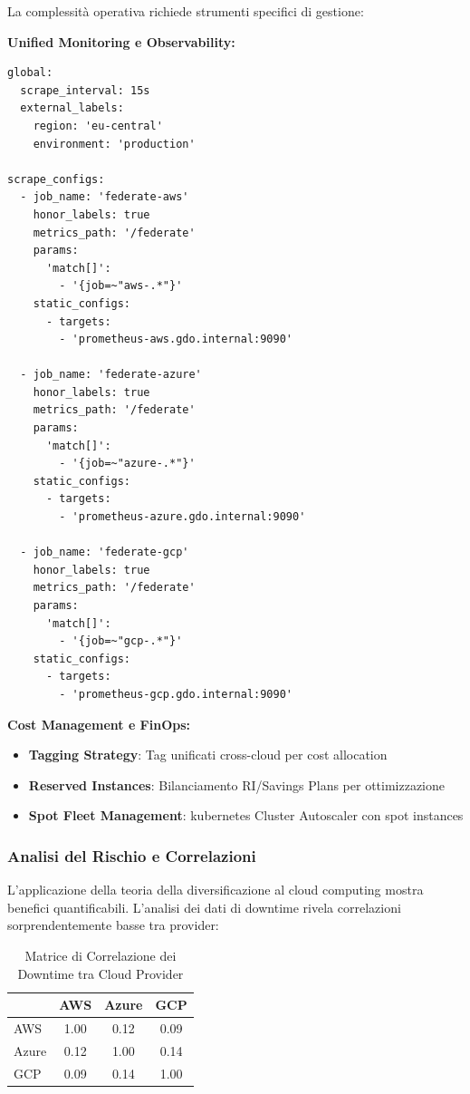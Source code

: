 La complessità operativa richiede strumenti specifici di gestione:

\textbf{Unified Monitoring e Observability:}
\begin{lstlisting}[caption={Prometheus Federation per Multi-Cloud},label={lst:prometheus_federation}]
global:
  scrape_interval: 15s
  external_labels:
    region: 'eu-central'
    environment: 'production'

scrape_configs:
  - job_name: 'federate-aws'
    honor_labels: true
    metrics_path: '/federate'
    params:
      'match[]':
        - '{job=~"aws-.*"}'
    static_configs:
      - targets:
        - 'prometheus-aws.gdo.internal:9090'
        
  - job_name: 'federate-azure'
    honor_labels: true
    metrics_path: '/federate'
    params:
      'match[]':
        - '{job=~"azure-.*"}'
    static_configs:
      - targets:
        - 'prometheus-azure.gdo.internal:9090'
        
  - job_name: 'federate-gcp'
    honor_labels: true
    metrics_path: '/federate'
    params:
      'match[]':
        - '{job=~"gcp-.*"}'
    static_configs:
      - targets:
        - 'prometheus-gcp.gdo.internal:9090'
\end{lstlisting}

\textbf{Cost Management e FinOps:}
\begin{itemize}
    \item \textbf{Tagging Strategy}: Tag unificati cross-cloud per cost allocation
    \item \textbf{Reserved Instances}: Bilanciamento RI/Savings Plans per ottimizzazione
    \item \textbf{Spot Fleet Management}: \gls{kubernetes} Cluster Autoscaler con spot instances
\end{itemize}

\subsubsection{\texorpdfstring{Analisi del Rischio e Correlazioni}{3.4.2.4 - Analisi del Rischio e Correlazioni}}

L'applicazione della teoria della diversificazione\autocite{Tang2024portfolio} al cloud computing mostra benefici quantificabili. L'analisi dei dati di downtime rivela correlazioni sorprendentemente basse tra provider:

\begin{table}[htbp]
\centering
\caption{Matrice di Correlazione dei Downtime tra Cloud Provider}
\label{tab:cloud_correlation}
\begin{tabular}{lccc}
\toprule
& AWS & Azure & GCP \\
\midrule
AWS & 1.00 & 0.12 & 0.09 \\
Azure & 0.12 & 1.00 & 0.14 \\
GCP & 0.09 & 0.14 & 1.00 \\
\bottomrule
\end{tabular}
\end{table}

